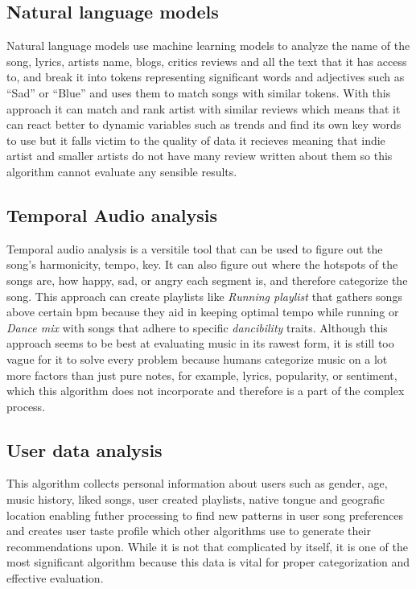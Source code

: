 \documentclass[10pt,twoside,slovak,a4paper]{article}
\begin{document}
\subsection{Natural language models}
Natural language models use machine learning models to analyze the name of the song, lyrics, artists name, blogs, critics reviews and all the text that it has access to, and break it into tokens representing significant words and adjectives such as ``Sad'' or ``Blue'' and uses them to match songs with similar tokens. With this approach it can match and rank artist with similar reviews which means that it can react better to dynamic variables such as trends and find its own key words to use but it falls victim to the quality of data it recieves meaning that indie artist and smaller artists do not have many review written about them so this algorithm cannot evaluate any sensible results.

\subsection{Temporal Audio analysis}
Temporal audio analysis is a versitile tool that can be used to figure out the song's harmonicity, tempo, key.\cite{794763}
It can also figure out where the hotspots of the songs are, how happy, sad, or angry each segment is, and therefore categorize the song. This approach can create playlists like \textit{Running playlist} that gathers songs above certain bpm because they aid in keeping optimal tempo while running or \textit{Dance mix} with songs that adhere to specific \textit{dancibility} traits. Although this approach seems to be best at evaluating music in its rawest form, it is still too vague for it to solve every problem because humans categorize music on a lot more factors than just pure notes, for example, lyrics, popularity, or sentiment, which this algorithm does not incorporate and therefore is a part of the complex process.

\subsection{User data analysis}
This algorithm collects personal information about users such as gender, age, music history, liked songs, user created playlists, native tongue and geografic location enabling futher processing to find new patterns in user song preferences and creates user taste profile which other algorithms use to generate their recommendations upon. While it is not that complicated by itself, it is one of the most significant algorithm because this data is vital for proper categorization and effective evaluation.
\end{document}
